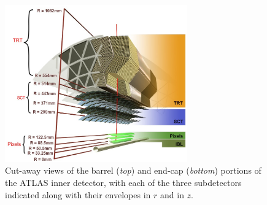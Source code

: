 \begin{figure}[!htb]
    \begin{center}
        \includegraphics[width=0.7\textwidth]{figures/chapter2/inner_detector/atlas_ID_barrel_exploded}
        \caption{
            Cut-away views of the barrel (\textit{top}) and end-cap (\textit{bottom}) portions
            of the ATLAS inner detector, with each of the three subdetectors indicated along with their
            envelopes in $r$ and in $z$.
        }
        \label{fig:atlas_ID_exploded}
    \end{center}
\end{figure}

